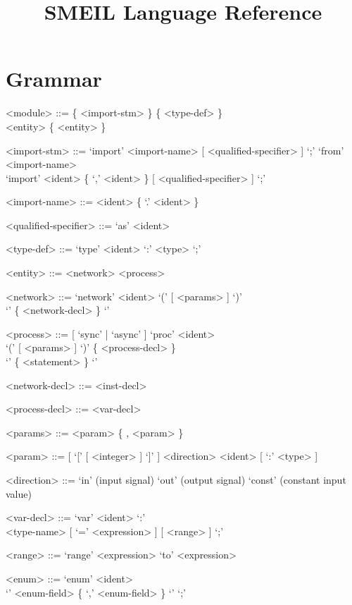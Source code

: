 \documentclass{article}
\title{SMEIL Language Reference}
\date{}
\begin{document}
\maketitle

\section*{Grammar}
\begin{grammar}
  <module> ::= \{ <import-stm> \} \{ <type-def> \} \\ <entity> \{ <entity> \}

  <import-stm> ::= `import' <import-name> [ <qualified-specifier> ] `;'
  \alt `from' <import-name> \\ `import' <ident> \{ `,' <ident> \} [ <qualified-specifier> ]
  `;'

  <import-name> ::= <ident> \{ `.' <ident> \}

  <qualified-specifier> ::= `as' <ident>

  <type-def> ::= `type' <ident> `:' <type> `;'

  <entity> ::= <network>
  \alt <process>

  <network> ::= `network' <ident> `(' [ <params> ] `)' \\`{' \{ <network-decl> \} `}'

  <process> ::= [ `sync' | `async' ] `proc' <ident> \\ `(' [
             <params> ] `)' \{ <process-decl> \}\\ `{' \{ <statement> \} `}'

  <network-decl> ::= <inst-decl>

  <process-decl> ::= <var-decl>
  
  <params> ::= <param> \{ , <param> \}

  <param> ::= [ `[' [ <integer> ] `]' ] <direction> <ident> [ `:' <type> ]

  <direction> ::= `in' (input signal)
  \alt `out' (output signal)
  \alt `const' (constant input value)  

   <var-decl> ::= `var' <ident> `:' \\ <type-name> [ `=' <expression> ] [ <range> ] `;'

  <range> ::= `range' <expression> `to' <expression>

  <enum> ::= `enum' <ident> \\ `{' <enum-field> \{ `,' <enum-field>  \} `}' `;'


\end{grammar}
\end{document}
